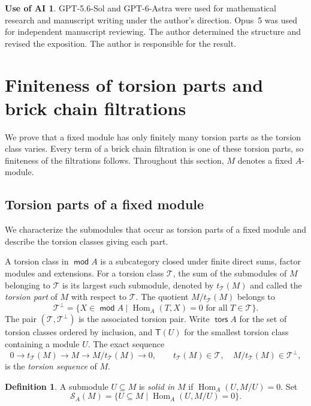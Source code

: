 \documentclass[a4paper,reqno,10pt]{amsart}
\theoremstyle{definition}
\newtheorem{definition}[theorem]{Definition}
\newtheorem*{aiuse}{Use of AI}
\numberwithin{equation}{section}
\newcommand{\Hom}{\operatorname{Hom}}
\DeclareMathOperator{\tors}{\mathsf{tors}}
\DeclareMathOperator{\modu}{\mathsf{mod}}
\newcommand{\T}{\mathcal T}
\newcommand{\Tgen}{\mathsf T}
\newcommand{\Sol}{\mathcal S}
\begin{document}
\begin{aiuse}
GPT-5.6-Sol and GPT-6-Astra were used for mathematical research and
manuscript writing under the author's direction. Opus~5 was used for
independent manuscript reviewing. The author determined the structure
and revised the exposition. The author is responsible for the result.
\end{aiuse}

\section{Finiteness of torsion parts and brick chain filtrations}\label{sec:finiteness}

We prove that a fixed module has only finitely many torsion parts as the
torsion class varies. Every term of a brick chain filtration is one of
these torsion parts, so finiteness of the filtrations follows.
Throughout this section, $M$ denotes a fixed $A$-module.

\subsection{Torsion parts of a fixed module}

We characterize the submodules that occur as torsion parts of a fixed
module and describe the torsion classes giving each part.

A torsion class in $\modu A$ is a subcategory closed under finite direct
sums, factor modules and extensions. For a torsion class $\T$, the sum
of the submodules of $M$ belonging to $\T$ is its largest such submodule,
denoted by $t_{\T}(M)$ and called the \emph{torsion part} of $M$ with
respect to $\T$. The quotient $M/t_\T(M)$ belongs to
\[
 \T^\perp=\{X\in\modu A\mid \Hom_A(T,X)=0\text{ for all }T\in\T\}.
\]
The pair $(\T,\T^\perp)$ is the associated torsion pair. Write
$\tors A$ for the set of torsion classes ordered by inclusion, and
$\Tgen(U)$ for the smallest torsion class containing a module $U$.
The exact sequence
\begin{equation}\label{eq:torsion-sequence}
 0\longrightarrow t_\T(M)\longrightarrow M
   \longrightarrow M/t_\T(M)\longrightarrow0,
 \qquad t_\T(M)\in\T,\quad M/t_\T(M)\in\T^\perp,
\end{equation}
is the \emph{torsion sequence} of $M$.

\begin{definition}\label{def:solid-submodule}
A submodule $U\subseteq M$ is \emph{solid in $M$} if
$\Hom_A(U,M/U)=0$. Set
\[
 \Sol_A(M)=\{U\subseteq M\mid \Hom_A(U,M/U)=0\}.
\]
\end{definition}
\end{document}
